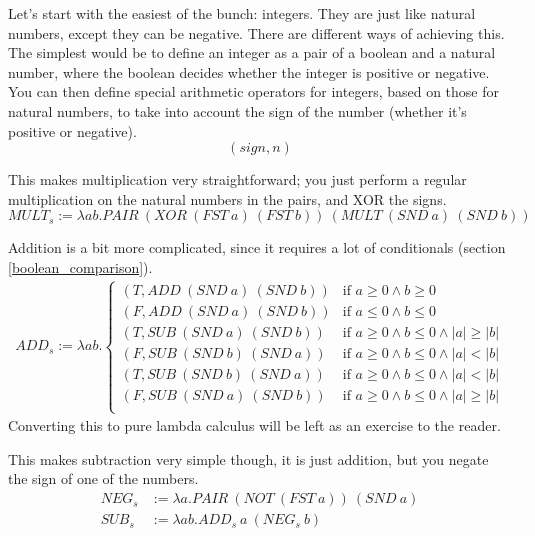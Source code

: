 \documentclass[11pt]{article}
\begin{document}
Let's start with the easiest of the bunch: integers. They are just like natural
numbers, except they can be negative. There are different ways of achieving
this. The simplest would be to define an integer as a pair of a boolean and a
natural number, where the boolean decides whether the integer is positive or
negative. You can then define special arithmetic operators for integers, based
on those for natural numbers, to take into account the sign of the number
(whether it's positive or negative).
\[(sign,n)\]

This makes multiplication very straightforward; you just perform a regular
multiplication on the natural numbers in the pairs, and XOR the signs.
\[MULT_s:=\lambda ab.PAIR\ (XOR\ (FST\ a)\ (FST\ b))\ (MULT\ (SND\ a)\ (SND\ b))\]

Addition is a bit more complicated, since it requires a lot of conditionals
(section \ref{boolean_comparison}).
\begin{align*}
	ADD_s:=\lambda ab.\left\{
		\begin{array}{ll}
			(T, ADD\ (SND\ a)\ (SND\ b))
				&\mbox{if } a \geq 0 \wedge b \geq 0 \\
			(F, ADD\ (SND\ a)\ (SND\ b))
				&\mbox{if } a \le 0 \wedge b \le 0 \\
			(T, SUB\ (SND\ a)\ (SND\ b))
				&\mbox{if } a \geq 0 \wedge b \le 0 \wedge \lvert a \rvert \geq \lvert b \rvert \\
			(F, SUB\ (SND\ b)\ (SND\ a))
				&\mbox{if } a \geq 0 \wedge b \le 0 \wedge \lvert a \rvert < \lvert b \rvert \\
			(T, SUB\ (SND\ b)\ (SND\ a))
				&\mbox{if } a \geq 0 \wedge b \le 0 \wedge \lvert a \rvert < \lvert b \rvert \\
			(F, SUB\ (SND\ a)\ (SND\ b))
				&\mbox{if } a \geq 0 \wedge b \le 0 \wedge \lvert a \rvert \geq \lvert b \rvert \\
		\end{array}
	\right.
\end{align*}
Converting this to pure lambda calculus will be left as an exercise to the
reader.

This makes subtraction very simple though, it is just addition, but you negate
the sign of one of the numbers.
\begin{align*}
	NEG_s&:=\lambda a.PAIR\ (NOT\ (FST\ a))\ (SND\ a) \\
	SUB_s&:=\lambda ab.ADD_s\ a\ (NEG_s\ b)
\end{align*}
\end{document}
